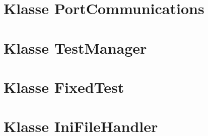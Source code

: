 \section{Klasse PortCommunications}
\paragraph{}

\subsection{}


\newpage


\section{Klasse TestManager}
\paragraph{}

\subsection{}

\newpage


\section{Klasse FixedTest}
\paragraph{}

\subsection{}

\newpage


\section{Klasse IniFileHandler}\label{IniFileHandler}
